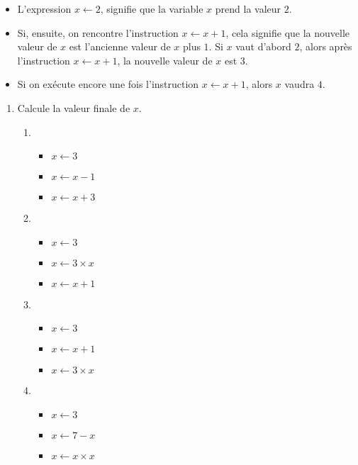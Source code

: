 \documentclass[class=report,crop=false, 12pt]{standalone}
\begin{document}
\begin{activite}
\sauteligne
\begin{itemize}
  \item L'expression $x \leftarrow 2$, signifie que la variable $x$ prend la valeur $2$.
  \item Si, ensuite, on rencontre l'instruction $x \leftarrow x + 1$, cela signifie que la nouvelle valeur de $x$ est l'ancienne valeur de $x$ plus $1$. Si $x$ vaut d'abord $2$, alors après l'instruction $x \leftarrow x + 1$, la nouvelle valeur de $x$ est $3$.
  \item Si on exécute encore une fois l'instruction $x \leftarrow x + 1$, alors $x$ vaudra $4$.
\end{itemize}

\begin{enumerate}
  \item Calcule la valeur finale de $x$.
  \begin{enumerate}
    
    \item 
    \begin{itemize}
      \item $x \leftarrow 3$
      \item $x \leftarrow x - 1$
      \item $x \leftarrow x + 3$
    \end{itemize}
    
    \item
    \begin{itemize}
      \item $x \leftarrow 3$
      \item $x \leftarrow 3 \times x$ 
      \item $x \leftarrow x + 1$
    \end{itemize}
    
    \item 
    \begin{itemize}
      \item $x \leftarrow 3$
      \item $x \leftarrow x + 1$
      \item $x \leftarrow 3 \times x$
    \end{itemize}
    
    \item 
    \begin{itemize}
      \item $x \leftarrow 3$
      \item $x \leftarrow 7 - x$
      \item $x \leftarrow x \times x$
    \end{itemize}     
  \end{enumerate}    
  

\end{enumerate}
\end{activite}
\end{document}
